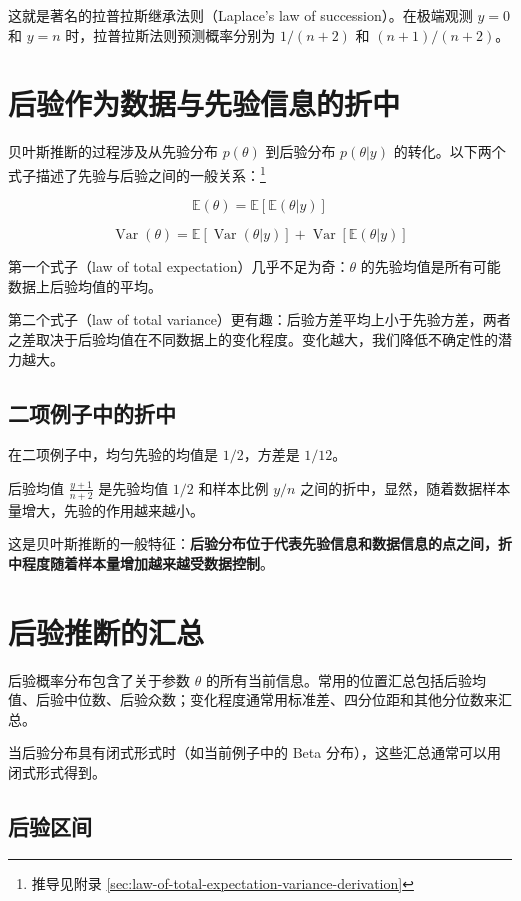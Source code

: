 这就是著名的拉普拉斯继承法则（Laplace's law of succession）。在极端观测 $y=0$ 和 $y=n$ 时，拉普拉斯法则预测概率分别为 $1/(n+2)$ 和 $(n+1)/(n+2)$。

\section{后验作为数据与先验信息的折中}

贝叶斯推断的过程涉及从先验分布 $p(\theta)$ 到后验分布 $p(\theta|y)$ 的转化。以下两个式子描述了先验与后验之间的一般关系：\footnote{推导见附录 \cref{sec:law-of-total-expectation-variance-derivation}}

\[
\mathbb{E}(\theta) = \mathbb{E}\left[\mathbb{E}(\theta|y)\right]
\]

\[
\operatorname{Var}(\theta) = \mathbb{E}\left[\operatorname{Var}(\theta|y)\right] + \operatorname{Var}\left[\mathbb{E}(\theta|y)\right]
\]

第一个式子（law of total expectation）几乎不足为奇：$\theta$ 的先验均值是所有可能数据上后验均值的平均。

第二个式子（law of total variance）更有趣：后验方差平均上小于先验方差，两者之差取决于后验均值在不同数据上的变化程度。变化越大，我们降低不确定性的潜力越大。

\subsection{二项例子中的折中}

在二项例子中，均匀先验的均值是 $1/2$，方差是 $1/12$。

后验均值 $\frac{y+1}{n+2}$ 是先验均值 $1/2$ 和样本比例 $y/n$ 之间的折中，显然，随着数据样本量增大，先验的作用越来越小。

这是贝叶斯推断的一般特征：\textbf{后验分布位于代表先验信息和数据信息的点之间，折中程度随着样本量增加越来越受数据控制}。

\section{后验推断的汇总}

后验概率分布包含了关于参数 $\theta$ 的所有当前信息。常用的位置汇总包括后验均值、后验中位数、后验众数；变化程度通常用标准差、四分位距和其他分位数来汇总。

当后验分布具有闭式形式时（如当前例子中的 Beta 分布），这些汇总通常可以用闭式形式得到。

\subsection{后验区间}


